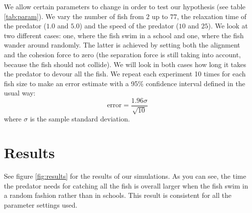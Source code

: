 \documentclass[11pt,a4paper]{article}
\begin{document}
We allow certain parameters to change in order to test our hypothesis (see table \ref{tab:param}). We vary the number of fish from $2$ up to $77$, the relaxation time of the predator ($1.0$ and $5.0$) and the speed of the predator ($10$ and $25$). We look at two different cases: one, where the fish swim in a school and one, where the fish wander around randomly. The latter is achieved by setting both the alignment and the cohesion force to zero (the separation force is still taking into account, because the fish should not collide). We will look in both cases how long it takes the predator to devour all the fish.  We repeat each experiment 10 times for each fish size to make an error estimate with a 95\% confidence interval defined in the usual way:
\begin{equation}
  \label{eq:error}
  \text{error} = \frac{1.96 \sigma}{\sqrt{10}}
\end{equation}
where $\sigma$ is the sample standard deviation. 

\section{Results}
\label{sec:res}
See figure \ref{fig:results} for the results of our simulations. As you can see, the time the predator needs for catching all the fish is overall larger when the fish swim in a random fashion rather than in schools. This result is consistent for all the parameter settings used. 
\end{document}
